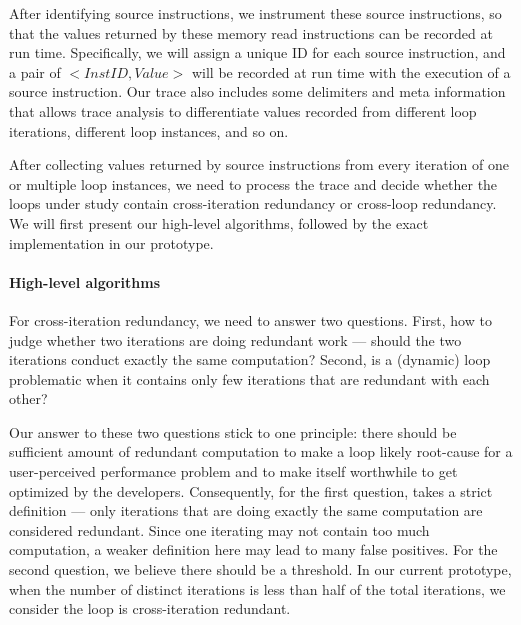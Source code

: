 After identifying source instructions, we instrument these source
instructions, so that the values returned by these memory read
instructions can be recorded at run time. Specifically, we will assign
a unique ID for each source instruction, and a pair of $<InstID, Value>$
will be recorded at run time with the execution of a source instruction.
Our trace also includes some delimiters and meta information that allows
trace analysis to differentiate values recorded from different loop
iterations, different loop instances, and so on.



After collecting values returned by source instructions from every iteration
of one or multiple loop instances, we need to process the trace and decide
whether the loops under study contain cross-iteration redundancy or 
cross-loop redundancy. We will first present our high-level algorithms, followed
by the exact implementation in our prototype.

\paragraph{High-level algorithms}
For cross-iteration redundancy, we need to answer two questions. 
First, how to judge whether
two iterations are doing redundant work --- should the two iterations conduct
exactly the same computation?
Second, is a (dynamic) loop problematic when it contains only few 
iterations that are
redundant with each other?

Our answer to these two questions stick to one principle: there should be
sufficient amount of redundant computation to make a loop likely root-cause
for a user-perceived performance problem and to make itself worthwhile to
get optimized by the developers. Consequently,
for the first question, \Tool takes a strict 
definition --- only iterations that are doing exactly the same computation are
considered redundant. Since one iterating may not contain too much computation,
a weaker definition here may lead to many false positives. For the 
second question, we believe there should be a threshold. In our current 
prototype,
when the number of distinct iterations is less than half of the total iterations, 
we consider the loop is cross-iteration redundant. 

